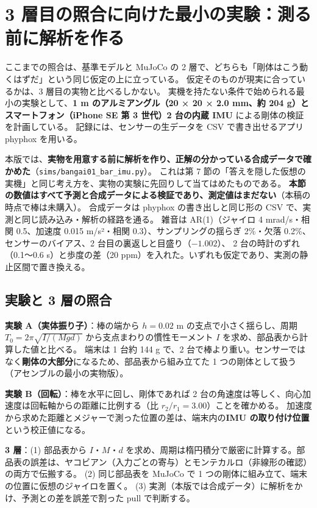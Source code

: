 \documentclass[paper=a4paper,fontsize=10pt,twocolumn,column_gap=2zw,line_length=24zw,number_of_lines=46,head_space=20mm]{jlreq}
\begin{document}
\section{3 層目の照合に向けた最小の実験：測る前に解析を作る}

ここまでの照合は、基準モデルと MuJoCo の 2 層で、どちらも「剛体はこう動くはずだ」という同じ仮定の上に立っている。
仮定そのものが現実に合っているかは、3 層目の実物と比べるしかない。
実機を持たない条件で始められる最小の実験として、\textbf{1 m のアルミアングル（20 × 20 × 2.0 mm、約 204 g）とスマートフォン（iPhone SE 第 3 世代）2 台の内蔵 IMU} による剛体の検証を計画している。
記録には、センサーの生データを CSV で書き出せるアプリ phyphox \cite{phyphox} を用いる。

本版では、\textbf{実物を用意する前に解析を作り、正解の分かっている合成データで確かめた}（\texttt{sims/bangai01\_bar\_imu.py}）。
これは第 7 節の「答えを隠した仮想の実機」と同じ考え方を、実物の実験に先回りして当てはめたものである。
\textbf{本節の数値はすべて予測と合成データによる検証であり、測定値はまだない}（本稿の時点で棒は未購入）。
合成データは phyphox の書き出しと同じ形の CSV で、実測と同じ読み込み・解析の経路を通る。
雑音は AR(1)（ジャイロ 4 mrad/s・相関 0.5、加速度 0.015 m/s²・相関 0.3）、サンプリングの揺らぎ 2\%・欠落 0.2\%、センサーのバイアス、2 台目の裏返しと目盛り（$-1.002$）、
2 台の時計のずれ（0.1〜0.6 s）と歩度の差（20 ppm）を入れた。いずれも仮定であり、実測の静止区間で置き換える。

\subsection{実験と 3 層の照合}

\textbf{実験 A（実体振り子）}：棒の端から $h=0.02$ m の支点で小さく揺らし、周期 $T_0=2\pi\sqrt{I/(Mgd)}$ から支点まわりの慣性モーメント $I$ を求め、部品表から計算した値と比べる。
端末は 1 台約 144 g で、2 台で棒より重い。センサーではなく\textbf{剛体の大部分}になるため、部品表から組み立てた 1 つの剛体として扱う（アセンブルの最小の実物版）。

\textbf{実験 B（回転）}：棒を水平に回し、剛体であれば 2 台の角速度は等しく、向心加速度は回転軸からの距離に比例する（比 $r_2/r_1 = 3.00$）ことを確かめる。
加速度から求めた距離とメジャーで測った位置の差は、端末内の\textbf{IMU の取り付け位置}という校正値になる。

\textbf{3 層}：(1) 部品表から $I$・$M$・$d$ を求め、周期は楕円積分で厳密に計算する。部品表の誤差は、ヤコビアン（入力ごとの寄与）とモンテカルロ（非線形の確認）の両方で伝搬する。
(2) 同じ部品表を MuJoCo で 1 つの剛体に組み立て、端末の位置に仮想のジャイロを置く。
(3) 実測（本版では合成データ）に解析をかけ、予測との差を誤差で割った pull で判断する。
\end{document}
